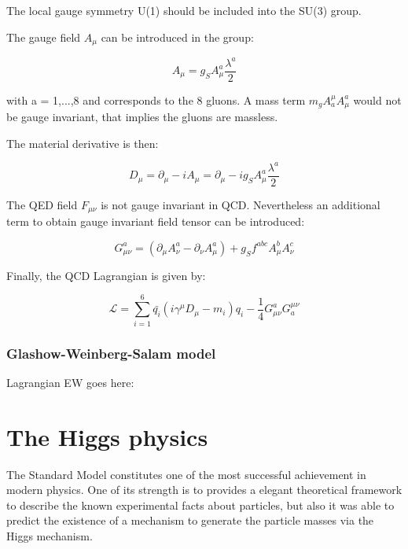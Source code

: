     The local gauge symmetry U(1) should be included into the SU(3) group.
    
    The gauge field $A_{\mu}$ can be introduced in the group:
    
    \begin{equation}
      A_{\mu} = g_S A^a_{\mu}\frac{\lambda^a}{2}
    \end{equation}
     
    with a = 1,...,8 and corresponds to the 8 gluons.
    A mass term  $m_g A^{\mu}_a A^a_{\mu}$ would not be gauge invariant, that implies the gluons are massless.

    The material derivative is then:

    \begin{equation}
      D_{\mu} = \partial_{\mu} - i A_{\mu} = \partial_{\mu} - i g_S A^a_{\mu} \frac{\lambda^a}{2}
    \end{equation}

    The QED field $F_{\mu \nu}$ is not gauge invariant in QCD.
    Nevertheless an additional term to obtain gauge invariant field tensor can be introduced:
    
    \begin{equation}
      G^a_{\mu \nu} = \left( \partial_{\mu} A^a_{\nu} - \partial_{\nu} A^a_{\mu} \right) + g_S f^{abc} A^b_{\mu} A^c_{\nu}
    \end{equation} 

    Finally, the QCD Lagrangian is given by:

    \begin{equation}
      \mathcal{L} = \sum_{i=1}^6  \bar{q_i} \left(i \gamma^{\mu}D_{\mu} -m_i \right)q_i - \frac{1}{4} G_{\mu \nu}^{a} G_{a}^{\mu \nu}
    \end{equation}
    
    \subsubsection{Glashow-Weinberg-Salam model}
  
    Lagrangian EW goes here: 

  \section{The Higgs physics}

    The Standard Model constitutes one of the most successful achievement in modern physics.
    One of its strength is to provides a elegant theoretical framework to describe the known experimental facts about particles, but also it was able to predict 
    the existence of a mechanism to generate the particle masses via the Higgs mechanism.

